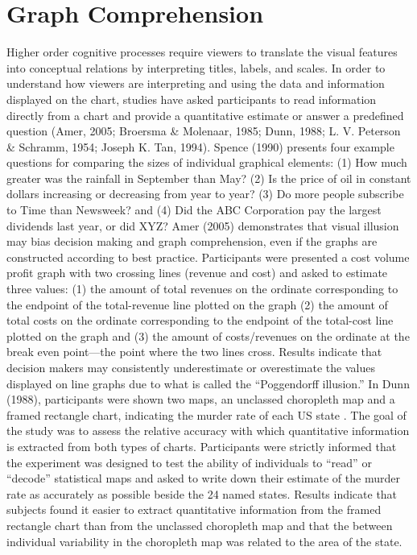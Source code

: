 \documentclass[print]{nuthesis}
\begin{document}
\hypertarget{graph-comprehension}{%
\section{Graph Comprehension}\label{graph-comprehension}}

Higher order cognitive processes require viewers to translate the visual features into conceptual relations by interpreting titles, labels, and scales.
In order to understand how viewers are interpreting and using the data and information displayed on the chart, studies have asked participants to read information directly from a chart and provide a quantitative estimate or answer a predefined question (Amer, 2005; Broersma \& Molenaar, 1985; Dunn, 1988; L. V. Peterson \& Schramm, 1954; Joseph K. Tan, 1994).
Spence (1990) presents four example questions for comparing the sizes of individual graphical elements: (1) How much greater was the rainfall in September than May? (2) Is the price of oil in constant dollars increasing or decreasing from year to year? (3) Do more people subscribe to Time than Newsweek? and (4) Did the ABC Corporation pay the largest dividends last year, or did XYZ?
Amer (2005) demonstrates that visual illusion may bias decision making and graph comprehension, even if the graphs are constructed according to best practice.
Participants were presented a cost volume profit graph  with two crossing lines (revenue and cost) and asked to estimate three values: (1) the amount of total revenues on the ordinate corresponding to the endpoint of the total-revenue line plotted on the graph (2) the amount of total costs on the ordinate corresponding to the endpoint of the total-cost line plotted on the graph and (3) the amount of costs/revenues on the ordinate at the break even point---the point where the two lines cross.
Results indicate that decision makers may consistently underestimate or overestimate the values displayed on line graphs due to what is called the ``Poggendorff illusion.''
In Dunn (1988), participants were shown two maps, an unclassed choropleth map and a framed rectangle chart, indicating the murder rate of each US state .
The goal of the study was to assess the relative accuracy with which quantitative information is extracted from both types of charts.
Participants were strictly informed that the experiment was designed to test the ability of individuals to ``read'' or ``decode'' statistical maps and asked to write down their estimate of the murder rate as accurately as possible beside the 24 named states.
Results indicate that subjects found it easier to extract quantitative information from the framed rectangle chart than from the unclassed choropleth map and that the between individual variability in the choropleth map was related to the area of the state.
\end{document}
